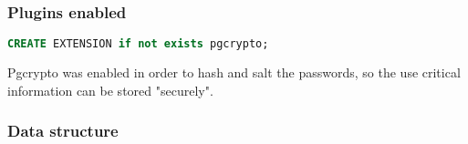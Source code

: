 \subsubsection[Plugins enabled]{Plugins enabled}
\begin{lstlisting}[language=SQL,label={lst:pgcrypto_enabling}]
CREATE EXTENSION if not exists pgcrypto;
\end{lstlisting}
\begin{flushleft}
    Pgcrypto was enabled in order to hash and salt the passwords, so the use critical information can be stored "securely".
\end{flushleft}

\newpage
\subsubsection[Data structure]{Data structure}
